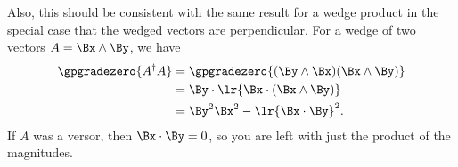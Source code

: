 


Also, this should be consistent with the same result for a wedge product in the special case that the wedged vectors are perpendicular.  For a wedge of two vectors $A = \Bx \wedge \By$, we have
\begin{equation}\label{eqn:xtox:80}
\begin{aligned}
\gpgradezero{A^\dagger A}
&= \gpgradezero{(\By \wedge \Bx)(\Bx \wedge \By)} \\
&= \By \cdot \lr{ \Bx \cdot (\Bx \wedge \By)} \\
&= \By^2 \Bx^2 - \lr{\Bx \cdot \By}^2.
\end{aligned}
\end{equation}
If $A$ was a versor, then \(\Bx \cdot \By = 0\), so you are left with just the product of the magnitudes.



